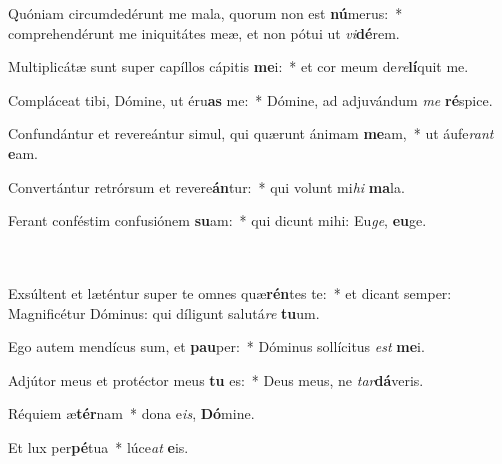 \item Quóniam circumdedérunt me mala, quorum non est \textbf{nú}merus:~* comprehendérunt me iniquitátes meæ, et non pótui ut \textit{vi}\textbf{dé}rem.

\item Multiplicátæ sunt super capíllos cápitis \textbf{me}i:~* et cor meum de\textit{re}\textbf{lí}quit me.

\item Compláceat tibi, Dómine, ut éru\textbf{as} me:~* Dómine, ad adjuvándum \textit{me} \textbf{ré}spice.

\item Confundántur et revereántur simul, qui quærunt ánimam \textbf{me}am,~* ut áufe\textit{rant} \textbf{e}am.

\item Convertántur retrórsum et revere\textbf{án}tur:~* qui volunt mi\textit{hi} \textbf{ma}la.

\item Ferant conféstim confusiónem \textbf{su}am:~* qui dicunt mihi: Eu\textit{ge}, \textbf{eu}ge.

\item ~\\~\\Exsúltent et læténtur super te omnes quæ\textbf{rén}tes te:~* et dicant semper: Magnificétur Dóminus: qui díligunt salutá\textit{re} \textbf{tu}um.

\item Ego autem mendícus sum, et \textbf{pau}per:~* Dóminus sollícitus \textit{est} \textbf{me}i.

\item Adjútor meus et protéctor meus \textbf{tu} es:~* Deus meus, ne \textit{tar}\textbf{dá}veris.

\item Réquiem æ\textbf{tér}nam~* dona e\textit{is}, \textbf{Dó}mine.

\item Et lux per\textbf{pé}tua~* lúce\textit{at} \textbf{e}is.